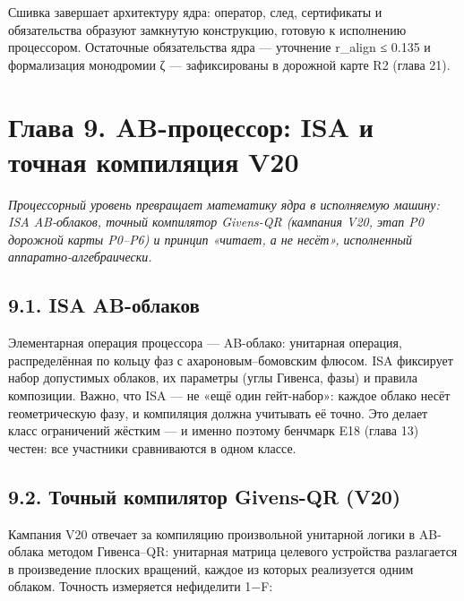 \documentclass[11pt,a4paper]{article}
\begin{document}
\begin{center}\end{center}

Сшивка завершает архитектуру ядра: оператор, след, сертификаты и обязательства образуют замкнутую конструкцию, готовую к исполнению процессором. Остаточные обязательства ядра — уточнение r\_align ≤ 0.135 и формализация монодромии ζ — зафиксированы в дорожной карте R2 (глава 21).

\section{Глава 9. AB-процессор: ISA и точная компиляция V20}

\noindent\textit{\color{copper}Процессорный уровень превращает математику ядра в исполняемую машину: ISA AB-облаков, точный компилятор Givens-QR (кампания V20, этап P0 дорожной карты P0–P6) и принцип «читает, а не несёт», исполненный аппаратно-алгебраически.}

\subsection{9.1. ISA AB-облаков}

Элементарная операция процессора — AB-облако: унитарная операция, распределённая по кольцу фаз с ахароновым–бомовским флюсом. ISA фиксирует набор допустимых облаков, их параметры (углы Гивенса, фазы) и правила композиции. Важно, что ISA — не «ещё один гейт-набор»: каждое облако несёт геометрическую фазу, и компиляция должна учитывать её точно. Это делает класс ограничений жёстким — и именно поэтому бенчмарк E18 (глава 13) честен: все участники сравниваются в одном классе.

\subsection{9.2. Точный компилятор Givens-QR (V20)}

Кампания V20 отвечает за компиляцию произвольной унитарной логики в AB-облака методом Гивенса–QR: унитарная матрица целевого устройства разлагается в произведение плоских вращений, каждое из которых реализуется одним облаком. Точность измеряется нефиделити 1−F:
\end{document}
